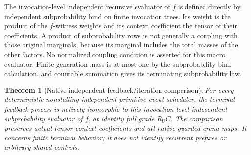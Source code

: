 \documentclass[11pt]{article}
\newtheorem{theorem}{Theorem}\newtheorem{proposition}[theorem]{Proposition}
\begin{document}
The invocation-level independent recursive evaluator of $f$ is defined directly by independent subprobability bind on finite invocation trees. Its weight is the product of the $f$-witness weights and its context coefficient the tensor of their coefficients. A product of subprobability rows is not generally a coupling with those original marginals, because its marginal includes the total masses of the other factors. No normalized coupling condition is asserted for this macro evaluator. Finite-generation mass is at most one by the subprobability bind calculation, and countable summation gives its terminating subprobability law.

\begin{theorem}[Native independent feedback/iteration comparison]
For every deterministic nonstalling independent primitive-event scheduler, the terminal feedback process is natively isomorphic to this invocation-level independent subprobability evaluator of $f$, at identity full grade $R_UC$. The comparison preserves actual tensor context coefficients and all native guarded arena maps. It concerns finite terminal behavior; it does not identify recurrent prefixes or arbitrary shared controls.
\end{theorem}
\end{document}

